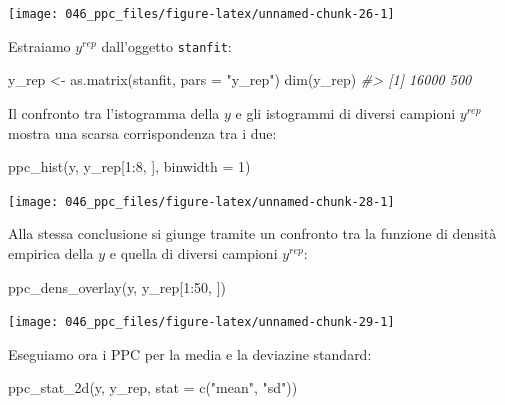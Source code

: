 \documentclass[
  10pt,
  italian,
  a4paper,
  extrafontsizes,onecolumn,openright
  ]{memoir}
\newenvironment{Shaded}{\begin{snugshade}}{\end{snugshade}}
\newcommand{\AttributeTok}[1]{\textcolor[rgb]{0.77,0.63,0.00}{#1}}
\newcommand{\CommentTok}[1]{\textcolor[rgb]{0.56,0.35,0.01}{\textit{#1}}}
\newcommand{\DecValTok}[1]{\textcolor[rgb]{0.00,0.00,0.81}{#1}}
\newcommand{\FunctionTok}[1]{\textcolor[rgb]{0.00,0.00,0.00}{#1}}
\newcommand{\NormalTok}[1]{#1}
\newcommand{\OtherTok}[1]{\textcolor[rgb]{0.56,0.35,0.01}{#1}}
\newcommand{\SpecialCharTok}[1]{\textcolor[rgb]{0.00,0.00,0.00}{#1}}
\newcommand{\StringTok}[1]{\textcolor[rgb]{0.31,0.60,0.02}{#1}}
\begin{document}
\begin{center}\texttt{[image: 046\_ppc\_files/figure-latex/unnamed-chunk-26-1]} \end{center}

\noindent
Estraiamo \(y^{rep}\) dall'oggetto \texttt{stanfit}:

\begin{Shaded}
\begin{Highlighting}[]
\NormalTok{y\_rep }\OtherTok{\textless{}{-}} \FunctionTok{as.matrix}\NormalTok{(stanfit, }\AttributeTok{pars =} \StringTok{"y\_rep"}\NormalTok{)}
\FunctionTok{dim}\NormalTok{(y\_rep) }
\CommentTok{\#\textgreater{} [1] 16000   500}
\end{Highlighting}
\end{Shaded}

Il confronto tra l'istogramma della \(y\) e gli istogrammi di diversi campioni \(y^{rep}\) mostra una scarsa corrispondenza tra i due:

\begin{Shaded}
\begin{Highlighting}[]
\FunctionTok{ppc\_hist}\NormalTok{(y, y\_rep[}\DecValTok{1}\SpecialCharTok{:}\DecValTok{8}\NormalTok{, ], }\AttributeTok{binwidth =} \DecValTok{1}\NormalTok{)}
\end{Highlighting}
\end{Shaded}

\begin{center}\texttt{[image: 046\_ppc\_files/figure-latex/unnamed-chunk-28-1]} \end{center}

Alla stessa conclusione si giunge tramite un confronto tra la funzione di densità empirica della \(y\) e quella di diversi campioni \(y^{rep}\):

\begin{Shaded}
\begin{Highlighting}[]
\FunctionTok{ppc\_dens\_overlay}\NormalTok{(y, y\_rep[}\DecValTok{1}\SpecialCharTok{:}\DecValTok{50}\NormalTok{, ])}
\end{Highlighting}
\end{Shaded}

\begin{center}\texttt{[image: 046\_ppc\_files/figure-latex/unnamed-chunk-29-1]} \end{center}

Eseguiamo ora i PPC per la media e la deviazine standard:

\begin{Shaded}
\begin{Highlighting}[]
\FunctionTok{ppc\_stat\_2d}\NormalTok{(y, y\_rep, }\AttributeTok{stat =} \FunctionTok{c}\NormalTok{(}\StringTok{"mean"}\NormalTok{, }\StringTok{"sd"}\NormalTok{))}
\end{Highlighting}
\end{Shaded}
\end{document}
